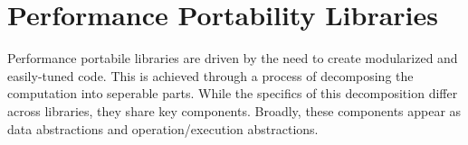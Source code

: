 \section{Performance Portability Libraries}
\begin{comment}
\begin{figure}
\begin{tabular*}{7in}[h]{|c|c | c c c c | c c |}
\hline
\makecell{Programming \\ Model} & Approach & \makecell{Multi-dimensional \\ Container} & \makecell{Sparse \\ Data} & \makecell{Static \\ Layout Changes} & \makecell{Dynamic \\ Layout Changes} & \makecell{Separated \\ Schedule} & \makecell{Cross-Kernel \\ Scheduling} \\ \hline
OpenMP & Directives & No & No & No & No & No\\
OpenACC & Directives \\
OpenCL & Language \\
HIP & Language & No & No & No & No & No & No \\
CUDA & Language & No & No & No & No & No & No \\
TACO & Language & Yes & Yes & Yes & Yes & Yes & Yes\\
CHiLL & Language \\
ExaStencil & Language \\
Tiramisu & Language \\
Halide & Language \\
Kokkos & Library & Yes & No & Yes & No & No\\
RAJA & Library & Yes & No & Yes & No & No\\
YAKL & Library & Yes & No & Yes & No & No\\
TBB & Library \\
\hline
\end{tabular*}
\end{figure}

\end{comment}
Performance portabile libraries are driven by the need to create modularized and easily-tuned code.
This is achieved through a process of decomposing the computation into seperable parts.
While the specifics of this decomposition differ across libraries, they share key components.
Broadly, these components appear as data abstractions and operation/execution abstractions.

